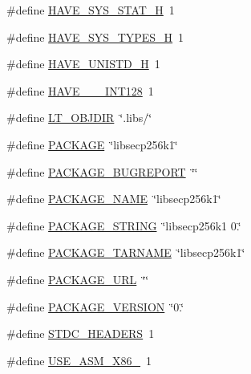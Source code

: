 \begin{DoxyCompactItemize}
\item 
\#define \hyperlink{libsecp256k1-config_8h_ace156430ba007d19b4348a950d0c692b}{H\+A\+V\+E\+\_\+\+S\+Y\+S\+\_\+\+S\+T\+A\+T\+\_\+\+H}~1
\item 
\#define \hyperlink{libsecp256k1-config_8h_a69dc70bea5d1f8bd2be9740e974fa666}{H\+A\+V\+E\+\_\+\+S\+Y\+S\+\_\+\+T\+Y\+P\+E\+S\+\_\+\+H}~1
\item 
\#define \hyperlink{libsecp256k1-config_8h_a219b06937831d0da94d801ab13987639}{H\+A\+V\+E\+\_\+\+U\+N\+I\+S\+T\+D\+\_\+\+H}~1
\item 
\#define \hyperlink{libsecp256k1-config_8h_a257c03531c72b8921c2cb5cf8761bdb3}{H\+A\+V\+E\+\_\+\+\_\+\+\_\+\+I\+N\+T128}~1
\item 
\#define \hyperlink{libsecp256k1-config_8h_ac2d5925d76379847dd9fc4747b061659}{L\+T\+\_\+\+O\+B\+J\+D\+I\+R}~\char`\"{}.libs/\char`\"{}
\item 
\#define \hyperlink{libsecp256k1-config_8h_aca8570fb706c81df371b7f9bc454ae03}{P\+A\+C\+K\+A\+G\+E}~\char`\"{}libsecp256k1\char`\"{}
\item 
\#define \hyperlink{libsecp256k1-config_8h_a1d1d2d7f8d2f95b376954d649ab03233}{P\+A\+C\+K\+A\+G\+E\+\_\+\+B\+U\+G\+R\+E\+P\+O\+R\+T}~\char`\"{}\char`\"{}
\item 
\#define \hyperlink{libsecp256k1-config_8h_a1c0439e4355794c09b64274849eb0279}{P\+A\+C\+K\+A\+G\+E\+\_\+\+N\+A\+M\+E}~\char`\"{}libsecp256k1\char`\"{}
\item 
\#define \hyperlink{libsecp256k1-config_8h_ac73e6f903c16eca7710f92e36e1c6fbf}{P\+A\+C\+K\+A\+G\+E\+\_\+\+S\+T\+R\+I\+N\+G}~\char`\"{}libsecp256k1 0.\char`\"{}
\item 
\#define \hyperlink{libsecp256k1-config_8h_af415af6bfede0e8d5453708afe68651c}{P\+A\+C\+K\+A\+G\+E\+\_\+\+T\+A\+R\+N\+A\+M\+E}~\char`\"{}libsecp256k1\char`\"{}
\item 
\#define \hyperlink{libsecp256k1-config_8h_a5c93853116d5a50307b6744f147840aa}{P\+A\+C\+K\+A\+G\+E\+\_\+\+U\+R\+L}~\char`\"{}\char`\"{}
\item 
\#define \hyperlink{libsecp256k1-config_8h_aa326a05d5e30f9e9a4bb0b4469d5d0c0}{P\+A\+C\+K\+A\+G\+E\+\_\+\+V\+E\+R\+S\+I\+O\+N}~\char`\"{}0.\char`\"{}
\item 
\#define \hyperlink{libsecp256k1-config_8h_a550e5c272cc3cf3814651721167dcd23}{S\+T\+D\+C\+\_\+\+H\+E\+A\+D\+E\+R\+S}~1
\item 
\#define \hyperlink{libsecp256k1-config_8h_a48e2cf8ebbae3dcc5f717ca031091cd2}{U\+S\+E\+\_\+\+A\+S\+M\+\_\+\+X86\+\_}~1
\item 

\end{DoxyCompactItemize}
